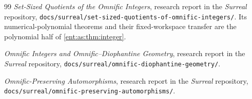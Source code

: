 \documentclass[11pt]{article}
\theoremstyle{plain}
\theoremstyle{plain}
\theoremstyle{plain}
\theoremstyle{definition}
\theoremstyle{definition}
\theoremstyle{definition}
\theoremstyle{definition}
\theoremstyle{remark}
\begin{document}
\begin{thebibliography}{99}
\emph{Set-Sized Quotients of the Omnific Integers}, research report in the
\emph{Surreal} repository,
\texttt{docs/surreal/set-sized-quotients-of-omnific-integers/}. Its
numerical-polynomial theorems and their fixed-workspace transfer are the
polynomial half of \cref{ent:as:thm:integer}.

\emph{Omnific Integers and Omnific--Diophantine Geometry}, research report in
the \emph{Surreal} repository,
\texttt{docs/surreal/omnific-diophantine-geometry/}.

\emph{Omnific-Preserving Automorphisms}, research report in the
\emph{Surreal} repository,
\texttt{docs/surreal/omnific-preserving-automorphisms/}.
\end{thebibliography}
\endgroup
\end{document}
